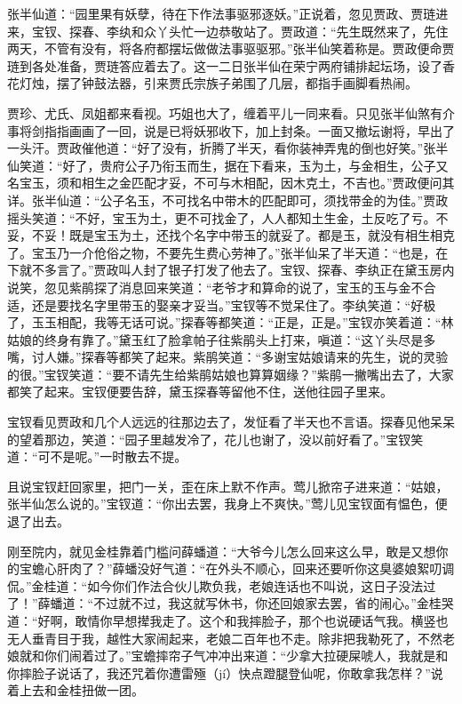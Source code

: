 \documentclass[12pt,oneside]{book}
\begin{document}
张半仙道：“园里果有妖孽，待在下作法事驱邪逐妖。”正说着，忽见贾政、贾琏进来，宝钗、探春、李纨和众丫头忙一边恭敬站了。贾政道：“先生既然来了，先住两天，不管有没有，将各府都摆坛做做法事驱驱邪。”张半仙笑着称是。贾政便命贾琏到各处准备，贾琏答应着去了。这一二日张半仙在荣宁两府铺排起坛场，设了香花灯烛，摆了钟鼓法器，引来贾氏宗族子弟围了几层，都指手画脚看热闹。

贾珍、尤氏、凤姐都来看视。巧姐也大了，缠着平儿一同来看。只见张半仙煞有介事将剑指指画画了一回，说是已将妖邪收下，加上封条。一面又撤坛谢将，早出了一头汗。贾政催他道：“好了没有，折腾了半天，看你装神弄鬼的倒也好笑。”张半仙笑道：“好了，贵府公子乃衔玉而生，据在下看来，玉为土，与金相生，公子又名宝玉，须和相生之金匹配才妥，不可与木相配，因木克土，不吉也。”贾政便问其详。张半仙道：“公子名玉，不可找名中带木的匹配即可，须找带金的为佳。”贾政摇头笑道：“不好，宝玉为土，更不可找金了，人人都知土生金，土反吃了亏。不妥，不妥！既是宝玉为土，还找个名字中带玉的就妥了。都是玉，就没有相生相克了。宝玉乃一介伧俗之物，不要先生费心劳神了。”张半仙呆了半天道：“也是，在下就不多言了。”贾政叫人封了银子打发了他去了。宝钗、探春、李纨正在黛玉房内说笑，忽见紫鹃探了消息回来笑道：“老爷才和算命的说了，宝玉的玉与金不合适，还是要找名字里带玉的娶亲才妥当。”宝钗等不觉呆住了。李纨笑道：“好极了，玉玉相配，我等无话可说。”探春等都笑道：“正是，正是。”宝钗亦笑着道：“林姑娘的终身有靠了。”黛玉红了脸拿帕子往紫鹃头上打来，嗔道：“这丫头尽是多嘴，讨人嫌。”探春等都笑了起来。紫鹃笑道：“多谢宝姑娘请来的先生，说的灵验的很。”宝钗笑道：“要不请先生给紫鹃姑娘也算算姻缘？”紫鹃一撇嘴出去了，大家都笑了起来。宝钗便要告辞，黛玉探春等留他不住，送他往园子里来。

宝钗看见贾政和几个人远远的往那边去了，发怔看了半天也不言语。探春见他呆呆的望着那边，笑道：“园子里越发冷了，花儿也谢了，没以前好看了。”宝钗笑道：“可不是呢。”一时散去不提。

且说宝钗赶回家里，把门一关，歪在床上默不作声。莺儿掀帘子进来道：“姑娘，张半仙怎么说的。”宝钗道：“你出去罢，我身上不爽快。”莺儿见宝钗面有愠色，便退了出去。

刚至院内，就见金桂靠着门槛问薛蟠道：“大爷今儿怎么回来这么早，敢是又想你的宝蟾心肝肉了？”薛蟠没好气道：“在外头不顺心，回来还要听你这臭婆娘絮叨调侃。”金桂道：“如今你们作法合伙儿欺负我，老娘连话也不叫说，这日子没法过了！”薛蟠道：“不过就不过，我这就写休书，你还回娘家去罢，省的闹心。”金桂哭道：“好啊，敢情你早想撵我走了。这个和我摔脸子，那个也说硬话气我。横竖也无人垂青目于我，越性大家闹起来，老娘二百年也不走。除非把我勒死了，不然老娘就和你们闹着过了。”宝蟾摔帘子气冲冲出来道：“少拿大拉硬屎唬人，我就是和你摔脸子说话了，我还咒着你遭雷殛（jí）快点蹬腿登仙呢，你敢拿我怎样？”说着上去和金桂扭做一团。
\end{document}
